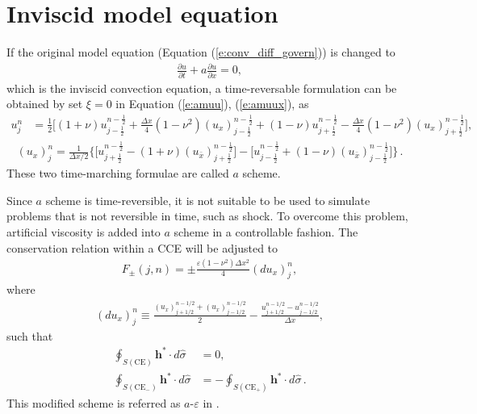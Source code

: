 \documentclass[letterpaper,12pt,dvips]{article}
\renewcommand{\vec}[1]{\mathbf{#1}}
\numberwithin{equation}{section}
\begin{document}
\section{Inviscid model equation}
\label{s:inviscid_model}

If the original model equation (Equation (\ref{e:conv_diff_govern})) 
is changed to 
\begin{align}
  \frac{\partial u}{\partial t} + a\frac{\partial u}{\partial x} = 0, 
    \label{e:conv_govern}
\end{align}
which is the inviscid convection equation, a time-reversable formulation 
can be obtained by set $\xi=0$ in Equation (\ref{e:amuu}), 
(\ref{e:amuux}), as 
\begin{align}
  u_j^n &= \frac{1}{2}\Big[
      (1+\nu)u_{j-\frac{1}{2}}^{n-\frac{1}{2}} 
    + \frac{\Delta x}{4}(1-\nu^2)(u_x)_{j-\frac{1}{2}}^{n-\frac{1}{2}}
    + (1-\nu)u_{j+\frac{1}{2}}^{n-\frac{1}{2}}
    - \frac{\Delta x}{4}(1-\nu^2)(u_x)_{j+\frac{1}{2}}^{n-\frac{1}{2}}
  \Big], \label{e:au}
\end{align}
\begin{align}
  (u_x)_j^n = \frac{1}{\Delta x/2}\Big\{
      \Big[ u_{j+\frac{1}{2}}^{n-\frac{1}{2}}
         - (1+\nu)(u_{\bar{x}})_{j+\frac{1}{2}}^{n-\frac{1}{2}} \Big]
    - \Big[ u_{j-\frac{1}{2}}^{n-\frac{1}{2}}
         + (1-\nu)(u_{\bar{x}})_{j-\frac{1}{2}}^{n-\frac{1}{2}} \Big]
  \Big\} \label{e:aux}\,.
\end{align}
These two time-marching formulae are called $a$ scheme.

Since $a$ scheme is time-reversible, it is not suitable to be used to 
simulate problems that is not reversible in time, such as shock.
To overcome this problem, artificial viscosity is added into $a$ scheme 
in a controllable fashion.
The conservation relation within a CCE will be adjusted to 
\begin{align}
  F_{\pm}(j,n) = \pm\frac{\varepsilon(1-\nu^2)\Delta x^2}{4}(du_x)_j^n, 
    \label{e:aeconserv}
\end{align}
where
\begin{align*}
  (du_x)_j^n \equiv 
    \frac{(u_x)_{j+1/2}^{n-1/2} + (u_x)_{j-1/2}^{n-1/2}}{2}
  - \frac{u_{j+1/2}^{n-1/2} - u_{j-1/2}^{n-1/2}}        {\Delta x}, 
\end{align*}
such that 
\begin{align*}
    \oint_{S(\mathrm{CE}  )}\vec{h}^*\cdot d\hat{\sigma} &= 0, \\
    \oint_{S(\mathrm{CE}_-)}\vec{h}^*\cdot d\hat{\sigma} &= 
  - \oint_{S(\mathrm{CE}_+)}\vec{h}^*\cdot d\hat{\sigma} \,.
\end{align*}
This modified scheme is referred as $a$-$\varepsilon$ in \cite{b:chang95}.
\end{document}
